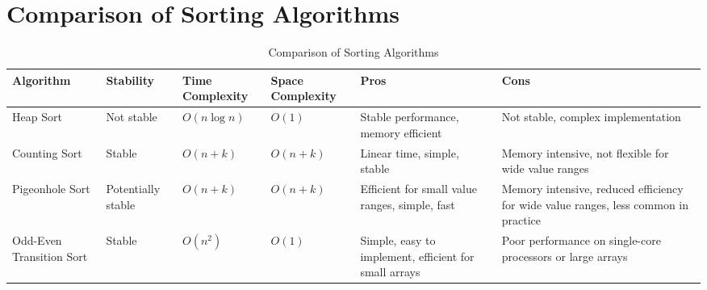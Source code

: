 \section{Comparison of Sorting Algorithms}

\begin{table}[H]
    \centering
    \renewcommand{\arraystretch}{1.2} %
    \setlength{\tabcolsep}{4pt} %
    \footnotesize 
    \begin{tabularx}{\textwidth}{|>{\centering\arraybackslash}X|>{\centering\arraybackslash}X|>{\centering\arraybackslash}X|>{\centering\arraybackslash}X|>{\centering\arraybackslash}X|>{\centering\arraybackslash}X|}
        \hline
        \textbf{Algorithm} & \textbf{Stability} & \textbf{Time Complexity} & \textbf{Space Complexity} & \textbf{Pros} & \textbf{Cons} \\ \hline
        Heap Sort          & Not stable         & $O(n \log n)$            & $O(1)$                    & Stable performance, memory efficient & Not stable, complex implementation \\ \hline
        Counting Sort      & Stable             & $O(n + k)$               & $O(n + k)$                & Linear time, simple, stable           & Memory intensive, not flexible for wide value ranges \\ \hline
        Pigeonhole Sort    & Potentially stable & $O(n + k)$               & $O(n + k)$                & Efficient for small value ranges, simple, fast & Memory intensive, reduced efficiency for wide value ranges, less common in practice \\ \hline
        Odd-Even Transition Sort & Stable & $O(n^2)$ & $O(1)$ & Simple, easy to implement, efficient for small arrays & Poor performance on single-core processors or large arrays \\ \hline
    \end{tabularx}
    \caption{Comparison of Sorting Algorithms}
    \label{tab:sorting_algorithms}
\end{table}
